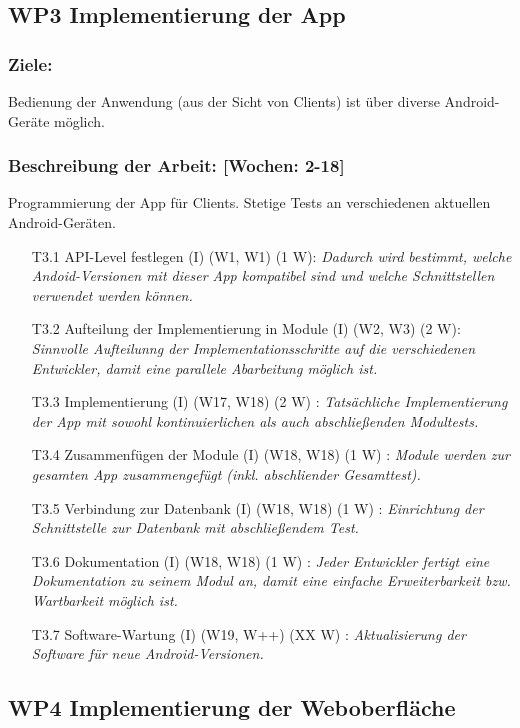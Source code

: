 \documentclass{report}
\begin{document}
\subsection*{WP3 Implementierung der App}

\subsubsection{Ziele:} Bedienung der Anwendung (aus der Sicht von Clients) ist über diverse Android-Geräte möglich.
\subsubsection{Beschreibung der Arbeit: [Wochen: 2-18]} Programmierung der App für Clients. Stetige Tests an verschiedenen aktuellen Android-Geräten.

\begin{enumerate}
\item [T3.1] API-Level festlegen (I) (W1, W1) (1 W): \emph{ Dadurch wird bestimmt, welche Andoid-Versionen mit dieser App kompatibel sind und welche Schnittstellen verwendet werden können.}
\item [T3.2] Aufteilung der Implementierung in Module (I) (W2, W3) (2 W): \emph{ Sinnvolle Aufteilunng der Implementationsschritte auf die verschiedenen Entwickler, damit eine parallele Abarbeitung möglich ist.}
\item [T3.3] Implementierung (I) (W17, W18) (2 W) : \emph{ Tatsächliche Implementierung der App mit sowohl kontinuierlichen als auch abschließenden Modultests.}
\item [T3.4] Zusammenfügen der Module (I) (W18, W18) (1 W) : \emph{ Module werden zur gesamten App zusammengefügt (inkl. abschliender Gesamttest).}
\item [T3.5] Verbindung zur Datenbank (I) (W18, W18) (1 W) : \emph{ Einrichtung der Schnittstelle zur Datenbank mit abschließendem Test.}
\item [T3.6] Dokumentation (I) (W18, W18) (1 W) : \emph{ Jeder Entwickler fertigt eine Dokumentation zu seinem Modul an, damit eine einfache Erweiterbarkeit bzw. Wartbarkeit möglich ist.}
\item [T3.7] Software-Wartung (I) (W19, W++) (XX W) : \emph{ Aktualisierung der Software für neue Android-Versionen.}
\end{enumerate}

\subsection*{WP4 Implementierung der Weboberfläche}
\end{document}
